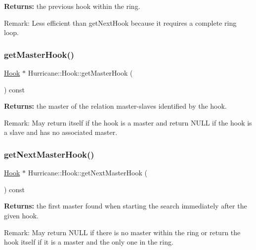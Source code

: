 {\bfseries Returns\+:} the previous hook within the ring.

\begin{DoxyParagraph}{Remark\+: Less efficient than get\+Next\+Hook because it requires a }
complete ring loop. 
\end{DoxyParagraph}
\mbox{\label{classHurricane_1_1Hook_af18e0531df4ed14b64cf058b780aee46}} 
\subsubsection{\texorpdfstring{get\+Master\+Hook()}{getMasterHook()}}
{\footnotesize\ttfamily \mbox{\hyperlink{classHurricane_1_1Hook}{Hook}} $\ast$ Hurricane\+::\+Hook\+::get\+Master\+Hook (\begin{DoxyParamCaption}{ }\end{DoxyParamCaption}) const}

{\bfseries Returns\+:} the master of the relation master-\/slaves identified by the hook.

\begin{DoxyParagraph}{Remark\+: May return itself if the hook is a master and return N\+U\+LL if }
the hook is a slave and has no associated master. 
\end{DoxyParagraph}
\mbox{\label{classHurricane_1_1Hook_a0923a5a2d0a7ee0458876eed72008e46}} 
\subsubsection{\texorpdfstring{get\+Next\+Master\+Hook()}{getNextMasterHook()}}
{\footnotesize\ttfamily \mbox{\hyperlink{classHurricane_1_1Hook}{Hook}} $\ast$ Hurricane\+::\+Hook\+::get\+Next\+Master\+Hook (\begin{DoxyParamCaption}{ }\end{DoxyParamCaption}) const}

{\bfseries Returns\+:} the first master found when starting the search immediately after the given hook.

\begin{DoxyParagraph}{Remark\+: May return N\+U\+LL if there is no master within the ring or }
return the hook itself if it is a master and the only one in the ring. 
\end{DoxyParagraph}
\mbox{\label{classHurricane_1_1Hook_a80bf5cdd4e81952064f1be94fe10188f}} 
